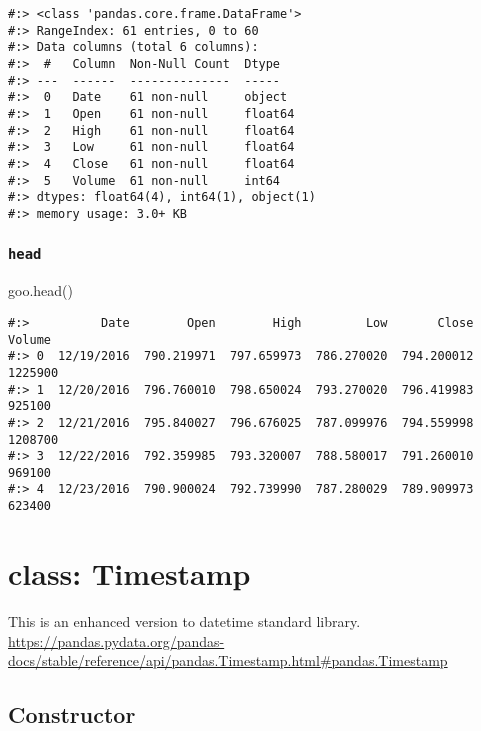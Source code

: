 \documentclass[
]{book}
\newenvironment{Shaded}{\begin{snugshade}}{\end{snugshade}}
\newcommand{\NormalTok}[1]{#1}
\begin{document}
\begin{verbatim}
#:> <class 'pandas.core.frame.DataFrame'>
#:> RangeIndex: 61 entries, 0 to 60
#:> Data columns (total 6 columns):
#:>  #   Column  Non-Null Count  Dtype  
#:> ---  ------  --------------  -----  
#:>  0   Date    61 non-null     object 
#:>  1   Open    61 non-null     float64
#:>  2   High    61 non-null     float64
#:>  3   Low     61 non-null     float64
#:>  4   Close   61 non-null     float64
#:>  5   Volume  61 non-null     int64  
#:> dtypes: float64(4), int64(1), object(1)
#:> memory usage: 3.0+ KB
\end{verbatim}

\hypertarget{head}{%
\subsubsection{\texorpdfstring{\texttt{head}}{head}}\label{head}}

\begin{Shaded}
\begin{Highlighting}[]
\NormalTok{goo.head()}
\end{Highlighting}
\end{Shaded}

\begin{verbatim}
#:>          Date        Open        High         Low       Close   Volume
#:> 0  12/19/2016  790.219971  797.659973  786.270020  794.200012  1225900
#:> 1  12/20/2016  796.760010  798.650024  793.270020  796.419983   925100
#:> 2  12/21/2016  795.840027  796.676025  787.099976  794.559998  1208700
#:> 3  12/22/2016  792.359985  793.320007  788.580017  791.260010   969100
#:> 4  12/23/2016  790.900024  792.739990  787.280029  789.909973   623400
\end{verbatim}

\hypertarget{class-timestamp}{%
\section{class: Timestamp}\label{class-timestamp}}

This is an enhanced version to datetime standard library.\\
\url{https://pandas.pydata.org/pandas-docs/stable/reference/api/pandas.Timestamp.html\#pandas.Timestamp}

\hypertarget{constructor-8}{%
\subsection{Constructor}\label{constructor-8}}
\end{document}
